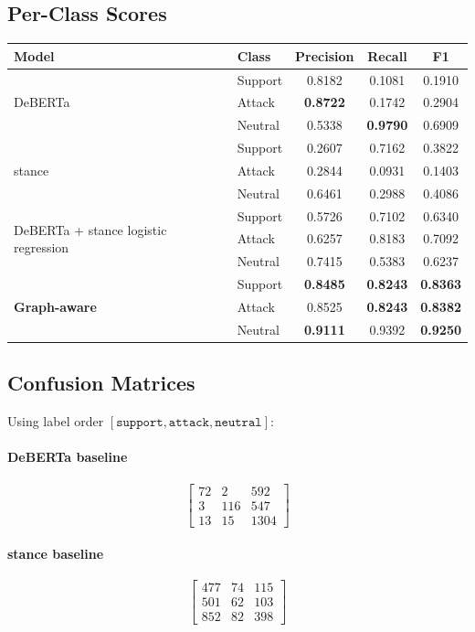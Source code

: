 \documentclass[11pt,a4paper]{article}
\begin{document}
\subsection{Per-Class Scores}
\begin{center}
\begin{tabular}{llccc}
\toprule
Model & Class & Precision & Recall & F1 \\
\midrule
\multirow{3}{*}{ DeBERTa}
  & Support & 0.8182 & 0.1081 & 0.1910 \\
  & Attack  & \textbf{0.8722} & 0.1742 & 0.2904 \\
  & Neutral & 0.5338 & \textbf{0.9790} & 0.6909 \\
\midrule
\multirow{3}{*}{ stance}
  & Support & 0.2607 & 0.7162 & 0.3822 \\
  & Attack  & 0.2844 & 0.0931 & 0.1403 \\
  & Neutral & 0.6461 & 0.2988 & 0.4086 \\
\midrule
\multirow{3}{*}{DeBERTa + stance logistic regression}
  & Support & 0.5726 & 0.7102 & 0.6340 \\
  & Attack  & 0.6257 & 0.8183 & 0.7092 \\
  & Neutral & 0.7415 & 0.5383 & 0.6237 \\
\midrule
\multirow{3}{*}{\textbf{Graph-aware}}
  & Support & \textbf{0.8485} & \textbf{0.8243} & \textbf{0.8363} \\
  & Attack  & 0.8525 & \textbf{0.8243} & \textbf{0.8382} \\
  & Neutral & \textbf{0.9111} & 0.9392 & \textbf{0.9250} \\
\bottomrule
\end{tabular}
\end{center}

\subsection{Confusion Matrices}
Using label order \([\texttt{support}, \texttt{attack}, \texttt{neutral}]\):

\paragraph{ DeBERTa baseline}
\[
\begin{bmatrix}
72 & 2 & 592 \\
3 & 116 & 547 \\
13 & 15 & 1304
\end{bmatrix}
\]

\paragraph{ stance baseline}
\[
\begin{bmatrix}
477 & 74 & 115 \\
501 & 62 & 103 \\
852 & 82 & 398
\end{bmatrix}
\]
\end{document}
